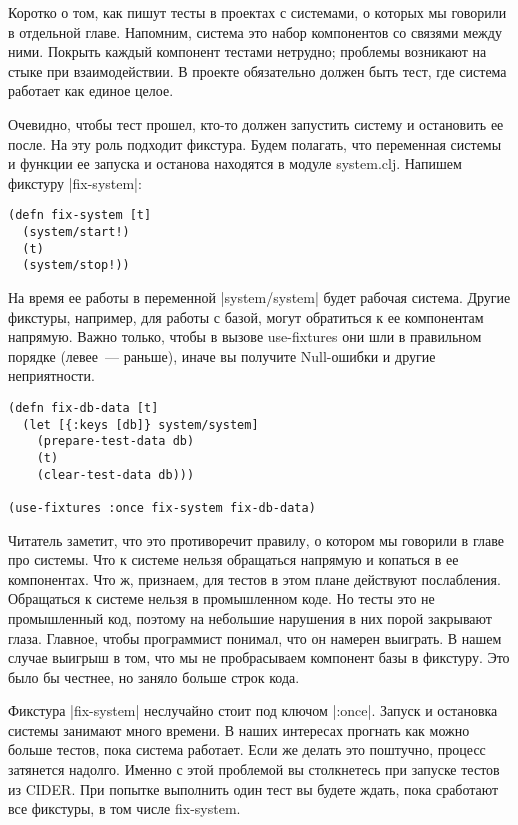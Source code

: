 Коротко о том, как пишут тесты в проектах с системами, о которых мы говорили в
отдельной главе. Напомним, система это набор компонентов со связями между
ними. Покрыть каждый компонент тестами нетрудно; проблемы возникают на стыке при
взаимодействии. В проекте обязательно должен быть тест, где система работает как
единое целое.

Очевидно, чтобы тест прошел, кто-то должен запустить систему и остановить ее
после. На эту роль подходит фикстура. Будем полагать, что переменная системы и
функции ее запуска и останова находятся в модуле system.clj. Напишем фикстуру
\spverb|fix-system|:

\begin{verbatim}
(defn fix-system [t]
  (system/start!)
  (t)
  (system/stop!))
\end{verbatim}

На время ее работы в переменной \spverb|system/system| будет рабочая система. Другие
фикстуры, например, для работы с базой, могут обратиться к ее компонентам
напрямую. Важно только, чтобы в вызове use-fixtures они шли в правильном порядке
(левее~--- раньше), иначе вы получите Null-ошибки и другие неприятности.

\begin{verbatim}
(defn fix-db-data [t]
  (let [{:keys [db]} system/system]
    (prepare-test-data db)
    (t)
    (clear-test-data db)))

(use-fixtures :once fix-system fix-db-data)
\end{verbatim}

Читатель заметит, что это противоречит правилу, о котором мы говорили в главе
про системы. Что к системе нельзя обращаться напрямую и копаться в ее
компонентах. Что ж, признаем, для тестов в этом плане действуют
послабления. Обращаться к системе нельзя в промышленном коде. Но тесты это не
промышленный код, поэтому на небольшие нарушения в них порой закрывают
глаза. Главное, чтобы программист понимал, что он намерен выиграть. В нашем
случае выигрыш в том, что мы не пробрасываем компонент базы в фикстуру. Это было
бы честнее, но заняло больше строк кода.

Фикстура \spverb|fix-system| неслучайно стоит под ключом \spverb|:once|. Запуск и остановка
системы занимают много времени. В наших интересах прогнать как можно больше
тестов, пока система работает. Если же делать это поштучно, процесс затянется
надолго. Именно с этой проблемой вы столкнетесь при запуске тестов из CIDER. При
попытке выполнить один тест вы будете ждать, пока сработают все фикстуры, в том
числе fix-system.


